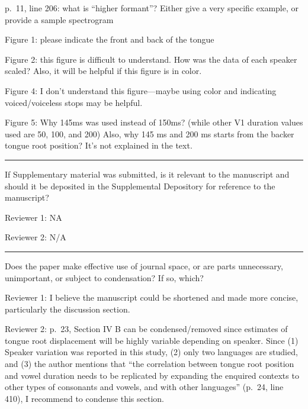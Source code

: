 \documentclass[]{article}
\begin{document}
p.~11, line 206: what is ``higher formant''? Either give a very specific
example, or provide a sample spectrogram

Figure 1: please indicate the front and back of the tongue

Figure 2: this figure is difficult to understand. How was the data of
each speaker scaled? Also, it will be helpful if this figure is in
color.

Figure 4: I don't understand this figure---maybe using color and
indicating voiced/voiceless stops may be helpful.

Figure 5: Why 145ms was used instead of 150ms? (while other V1 duration
values used are 50, 100, and 200) Also, why 145 ms and 200 ms starts
from the backer tongue root position? It's not explained in the text.

\par

\noindent

\rule{\textwidth}{0.4pt}

If Supplementary material was submitted, is it relevant to the
manuscript and should it be deposited in the Supplemental Depository for
reference to the manuscript?

Reviewer 1: NA

Reviewer 2: N/A

\par

\noindent

\rule{\textwidth}{0.4pt}

Does the paper make effective use of journal space, or are parts
unnecessary, unimportant, or subject to condensation? If so, which?

Reviewer 1: I believe the manuscript could be shortened and made more
concise, particularly the discussion section.

Reviewer 2: p.~23, Section IV B can be condensed/removed since estimates
of tongue root displacement will be highly variable depending on
speaker. Since (1) Speaker variation was reported in this study, (2)
only two languages are studied, and (3) the author mentions that ``the
correlation between tongue root position and vowel duration needs to be
replicated by expanding the enquired contexts to other types of
consonants and vowels, and with other languages'' (p.~24, line 410), I
recommend to condense this section.

\par

\noindent
\end{document}
